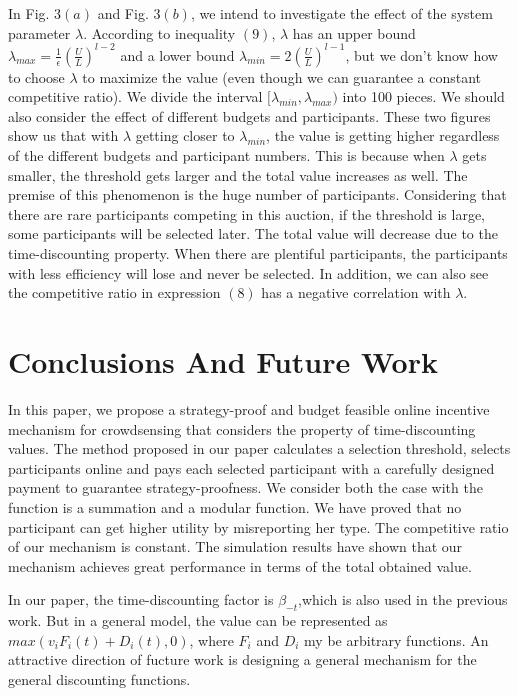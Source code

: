\documentclass[conference,compsocconf,letterpaper,10pt]{IEEEtran}
\begin{document}
In Fig. $3(a)$ and Fig. $3(b)$, we intend to investigate the effect of the system parameter $\lambda$. According to inequality $(9)$, $\lambda$ has an upper bound $\lambda_{max}= \frac{1}{\epsilon}\left(\frac{U}{L}\right)^{l-2}$ and a lower bound $\lambda_{min}=2\left(\frac{U}{L}\right)^{l-1}$, but we don't know how to choose $\lambda$ to maximize the value (even though we can  guarantee a constant competitive ratio). We divide the interval $[\lambda_{min}, \lambda_{max})$ into 100 pieces. We should also consider the effect of different budgets and participants. These two figures show us that with  $\lambda$ getting closer to $\lambda_{min}$, the value is getting higher regardless of the different budgets and participant numbers. This is because when $\lambda$ gets smaller, the threshold gets larger and the total value increases as well. The premise of this phenomenon is the huge number of participants. Considering that there are rare participants competing in this auction, if the threshold is large, some participants will be selected later. The total value will decrease due to the time-discounting property. When there are plentiful participants, the participants with less efficiency will lose and never be selected. In addition, we can also see the competitive ratio in expression $(8)$ has a negative correlation with $\lambda$.

\section{Conclusions And Future Work}
In this paper, we propose a strategy-proof and budget feasible online incentive mechanism for crowdsensing that considers the property of time-discounting values. The method proposed in our paper calculates a selection threshold, selects participants online and pays each selected participant with a carefully designed payment to guarantee strategy-proofness. We consider both the case with the function is a summation and a modular function. We have proved that no participant can get higher utility by misreporting her type. The competitive ratio of our mechanism is constant. The simulation results have shown that our mechanism achieves great performance in terms of the total obtained value.

In our paper, the time-discounting factor is $\beta_{-t}$,which is also used in the previous work. But in a general model, the value can be represented as $max(v_iF_i(t)+D_i(t),0)$, where $F_i$ and $D_i$ my be arbitrary functions. An attractive direction of fucture work is designing a general mechanism for the general discounting functions.


\end{document}
